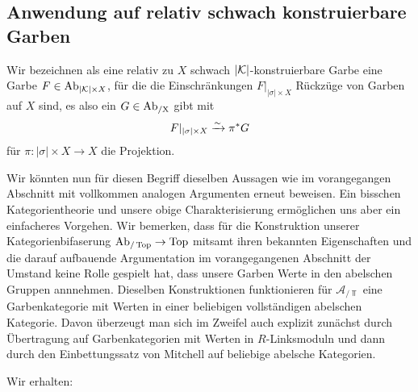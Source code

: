 \subsection{Anwendung auf relativ schwach konstruierbare Garben} 

Wir bezeichnen als eine relativ zu $X$ schwach $|\mathcal{K}|$-konstruierbare
Garbe eine Garbe $F \in \operatorname{Ab}_{|\mathcal{K}| \times X}$, für die die
Einschränkungen $F|_{|\sigma| \times X}$ Rückzüge von Garben auf $X$
sind, es also ein $G \in \operatorname{Ab_{/X}}$ gibt mit
\[ F|_{|\sigma| \times X} \xrightarrow[]{\sim} \pi^* G \]
für $\pi: |\sigma| \times X \to X$ die Projektion.

Wir könnten nun für diesen Begriff dieselben Aussagen wie im
vorangegangen Abschnitt mit vollkommen analogen Argumenten erneut
beweisen. Ein bisschen Kategorientheorie und unsere obige
Charakterisierung ermöglichen uns aber ein einfacheres Vorgehen. Wir
bemerken, dass für die Konstruktion unserer Kategorienbifaserung
$\operatorname{Ab}_{/\operatorname{Top}} \to \operatorname{Top}$ mitsamt ihren bekannten Eigenschaften und die
darauf aufbauende Argumentation im vorangegangenen Abschnitt der
Umstand keine Rolle gespielt hat, dass unsere Garben Werte in den
abelschen Gruppen annnehmen. Dieselben Konstruktionen funktionieren
für $\mathcal{A}_{/\Top}$ eine Garbenkategorie mit Werten in einer
beliebigen vollständigen abelschen Kategorie. Davon überzeugt man sich
im Zweifel auch explizit zunächst durch Übertragung auf
Garbenkategorien mit Werten in $R$-Linksmoduln und dann durch den
Einbettungssatz von Mitchell auf beliebige abelsche Kategorien.

Wir erhalten:
\begin{theorem}
\end{theorem}



